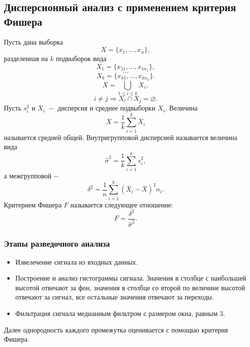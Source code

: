 \documentclass[a4paper]{article}
\begin{document}
\subsection{Дисперсионный анализ с применением критерия Фишера}
Пусть дана выборка
\begin{equation*}
    X = \{x_1,\hdots, x_n\},
\end{equation*}
разделенная на $k$ подвыборок вида
\begin{equation*}
    X_1 = \{x_{11},\hdots, x_{1n_1}\},
\end{equation*}
\begin{equation*}
    \hdots
\end{equation*}
\begin{equation*}
    X_k = \{x_{k1},\hdots, x_{kn_k}\}.
\end{equation*}
\begin{equation*}
    X=\bigcup_{1\leq i\leq k} X_i,
\end{equation*}
\begin{equation*}
    i\neq j\Longrightarrow X_i \cap X_j = \varnothing.
\end{equation*}
Пусть $s_i^2$ и $\overline{X}_i\;-$ дисперсия и среднее подвыборки $X_i$. Величина
\begin{equation*}
    \overline{X}=\dfrac{1}{k}\sum_{i=1}^k \overline{X}_i
\end{equation*}
называется средней общей. Внутригрупповой дисперсией называется величина вида
\begin{equation}
    \widehat{\sigma}^2=\dfrac{1}{k}\sum_{i=1}^k s_i^2,
\end{equation}
а межгрупповой $-$
\begin{equation}
    \delta^2=\dfrac{1}{n}\sum_{i=1}^k\left(\overline{X}_i-\overline{X}\right)^2  n_i.
\end{equation}
Критерием Фишера $F$ называется следующее отношение:
\begin{equation}
    F=\dfrac{\delta^2}{\widehat{\sigma}^2}.
\end{equation}
\subsubsection*{Этапы разведочного анализа}
\begin{itemize}
    \item Извелечение сигнала из входных данных.
    \item Построение и анализ гистограммы сигнала. Значения в столбце с наибольшей высотой отвечают за фон, значения в столбце со второй по величине высотой отвечают за сигнал, все остальные значения отвечают за переходы.
    \item Фильтрация сигнала медианным фильтром с размером окна, равным 3.
\end{itemize}
Далее однородность каждого промежутка оценивается с помощью критерия Фишера.
\end{document}

